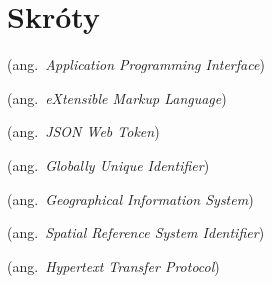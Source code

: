 % 
\chapter*{Skróty}
\label{sec:skroty}
\noindent\vspace{-\topsep-\partopsep-\parsep} %
\begin{description}[labelwidth=*]
  \item [API] (ang.\ \emph{Application Programming Interface})
  \item [XML] (ang.\ \emph{eXtensible Markup Language})
  \item [JWT] (ang.\ \emph{JSON Web Token})
  \item [GUID] (ang.\ \emph{Globally Unique Identifier})
  \item [GIS] (ang.\ \emph{Geographical Information System})
  \item [SRID] (ang.\ \emph{Spatial Reference System Identifier})
  \item [HTTP] (ang.\ \emph{Hypertext Transfer Protocol})
\end{description}
